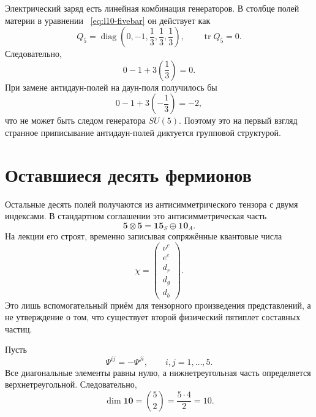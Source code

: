 Электрический заряд есть линейная комбинация генераторов. В столбце полей материи в уравнении ~\eqref{eq:l10-fivebar} он действует как
\begin{equation}
Q_{\overline5}
=
\operatorname{diag}
\left(0,-1,\frac13,\frac13,\frac13\right),
\qquad
\operatorname{tr}Q_{\overline5}=0.
\label{eq:l10-charge-fivebar}
\end{equation}
Следовательно,
\begin{equation}
0-1+3\left(\frac13\right)=0.
\end{equation}
При замене антидаун-полей на даун-поля получилось бы
\begin{equation}
0-1+3\left(-\frac13\right)=-2,
\end{equation}
что не может быть следом генератора \(SU(5)\). Поэтому это на первый взгляд странное приписывание антидаун-полей диктуется групповой структурой.

\section{Оставшиеся десять фермионов}

Остальные десять полей получаются из антисимметрического тензора с двумя индексами. В стандартном соглашении это антисимметрическая часть
\begin{equation}
\mathbf5\otimes\mathbf5
=\mathbf{15}_S\oplus\mathbf{10}_A.
\label{eq:l10-five-five}
\end{equation}
На лекции его строят, временно записывая сопряжённые квантовые числа
\begin{equation}
\chi=
\begin{pmatrix}
\nu^c\\
e^c\\
d_r\\
d_g\\
d_b
\end{pmatrix}.
\label{eq:l10-aux-five}
\end{equation}
Это лишь вспомогательный приём для тензорного произведения представлений, а не утверждение о том, что существует второй физический пятиплет составных частиц.

Пусть
\begin{equation}
\Psi^{ij}=-\Psi^{ji},
\qquad
i,j=1,\ldots,5.
\label{eq:l10-antisym-ten}
\end{equation}
Все диагональные элементы равны нулю, а нижнетреугольная часть определяется верхнетреугольной. Следовательно,
\begin{equation}
\dim\mathbf{10}
=\binom52
=\frac{5\cdot4}{2}
=10.
\label{eq:l10-ten-count}
\end{equation}

